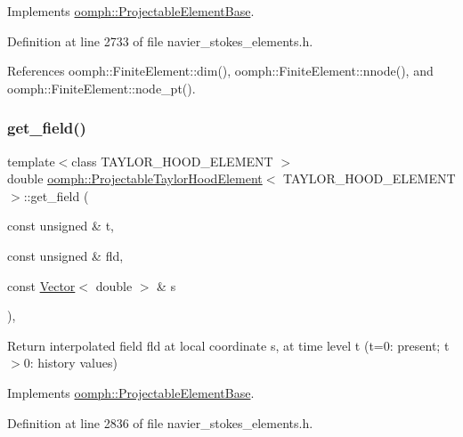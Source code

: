 Implements \hyperlink{classoomph_1_1ProjectableElementBase_a644306ebdf16f334344c2d27d72f18b7}{oomph\+::\+Projectable\+Element\+Base}.



Definition at line 2733 of file navier\+\_\+stokes\+\_\+elements.\+h.



References oomph\+::\+Finite\+Element\+::dim(), oomph\+::\+Finite\+Element\+::nnode(), and oomph\+::\+Finite\+Element\+::node\+\_\+pt().

\mbox{\label{classoomph_1_1ProjectableTaylorHoodElement_aff36e945b4f1c625b5b539bac2518b6f}} 
\subsubsection{\texorpdfstring{get\+\_\+field()}{get\_field()}}
{\footnotesize\ttfamily template$<$class T\+A\+Y\+L\+O\+R\+\_\+\+H\+O\+O\+D\+\_\+\+E\+L\+E\+M\+E\+NT $>$ \\
double \hyperlink{classoomph_1_1ProjectableTaylorHoodElement}{oomph\+::\+Projectable\+Taylor\+Hood\+Element}$<$ T\+A\+Y\+L\+O\+R\+\_\+\+H\+O\+O\+D\+\_\+\+E\+L\+E\+M\+E\+NT $>$\+::get\+\_\+field (\begin{DoxyParamCaption}\item[{const unsigned \&}]{t,  }\item[{const unsigned \&}]{fld,  }\item[{const \hyperlink{classoomph_1_1Vector}{Vector}$<$ double $>$ \&}]{s }\end{DoxyParamCaption})\hspace{0.3cm}{\ttfamily [inline]}, {\ttfamily [virtual]}}



Return interpolated field fld at local coordinate s, at time level t (t=0\+: present; t$>$0\+: history values) 



Implements \hyperlink{classoomph_1_1ProjectableElementBase_ae4da5b565b6d333be2f5920f7be763cd}{oomph\+::\+Projectable\+Element\+Base}.



Definition at line 2836 of file navier\+\_\+stokes\+\_\+elements.\+h.



